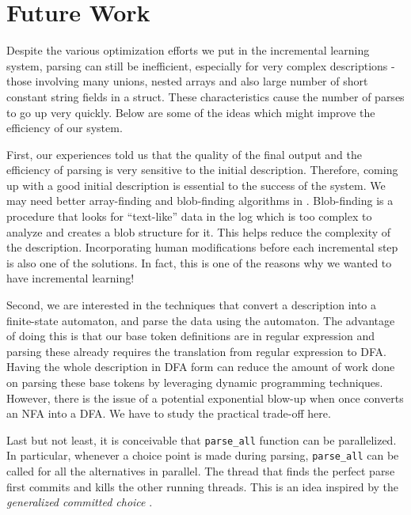 \section{Future Work}
\label{sec:future}
Despite the various optimization efforts we put in
the incremental learning system, parsing can still
be inefficient, especially for very complex descriptions
- those involving many unions, nested arrays and also
large number of short constant string fields in a struct.
These characteristics cause the
number of parses to go up very quickly. Below
are some of the ideas which might improve the
efficiency of our system.

First, our experiences told us that
the quality of the final output and the efficiency
of parsing is very sensitive to the initial
description. Therefore, coming up with a good
initial description is essential to the success
of the system. We may need better array-finding and
blob-finding algorithms in \learnpads{}. Blob-finding
is a procedure that looks for ``text-like'' data in the
log which is too complex to analyze and creates a blob
structure for it. This helps reduce the complexity of
the description. Incorporating human modifications 
before each incremental step is also one of the solutions.
In fact, this is one of the reasons why we wanted to
have incremental learning!

Second, we are interested in the techniques that
convert a \pads{} description into a finite-state
automaton, and parse the data using the automaton.
The advantage of doing this is that our base token
definitions are in regular expression and parsing 
these already requires the translation from regular
expression to DFA. Having the whole description in
DFA form can reduce the amount of work done on parsing
these base tokens by leveraging dynamic programming
techniques. However, there is the issue of a potential
exponential blow-up when once converts an NFA into
a DFA. We have to study the practical trade-off here.
 
Last but not least, it is conceivable that 
{\tt parse\_all} function can be parallelized. In
particular, whenever a choice point is made during
parsing, {\tt parse\_all}
can be called for all the alternatives in
parallel. The thread that finds the perfect
parse first commits and kills the other running threads.
This is an idea inspired by the {\em generalized committed 
choice} \cite{JaffarYZ07:gcc}. 
 

